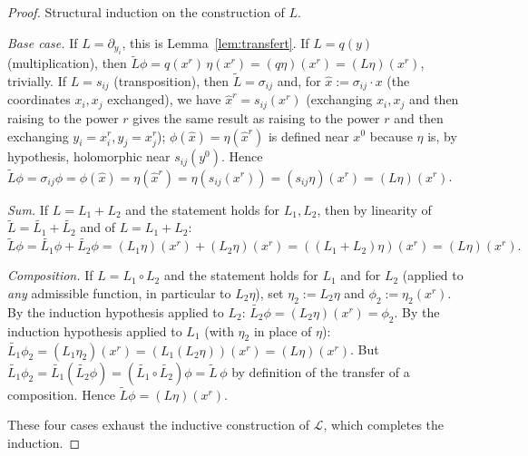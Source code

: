 \documentclass[11pt]{article}
\theoremstyle{remark}
\begin{document}
\begin{proof}
Structural induction on the construction of $L$.

\emph{Base case.} If $L=\partial_{y_i}$, this is Lemma~\ref{lem:transfert}. If $L=q(y)$ (multiplication), then $\widetilde L\phi = q(x^r)\,\eta(x^r) = (q\eta)(x^r) = (L\eta)(x^r)$, trivially. If $L=s_{ij}$ (transposition), then $\widetilde L=\sigma_{ij}$ and, for $\hat x:=\sigma_{ij}\cdot x$ (the coordinates $x_i,x_j$ exchanged), we have $\hat x^r = s_{ij}(x^r)$ (exchanging $x_i,x_j$ and then raising to the power $r$ gives the same result as raising to the power $r$ and then exchanging $y_i=x_i^r,y_j=x_j^r$); $\phi(\hat x)=\eta(\hat x^r)$ is defined near $x^0$ because $\eta$ is, by hypothesis, holomorphic near $s_{ij}(y^0)$. Hence $\widetilde L\phi = \sigma_{ij}\phi = \phi(\hat x) = \eta(\hat x^r) = \eta(s_{ij}(x^r)) = (s_{ij}\eta)(x^r) = (L\eta)(x^r)$.

\emph{Sum.} If $L=L_1+L_2$ and the statement holds for $L_1,L_2$, then by linearity of $\widetilde L=\widetilde{L_1}+\widetilde{L_2}$ and of $L=L_1+L_2$:
\[
\widetilde L\phi = \widetilde{L_1}\phi+\widetilde{L_2}\phi = (L_1\eta)(x^r)+(L_2\eta)(x^r) = ((L_1+L_2)\eta)(x^r) = (L\eta)(x^r).
\]

\emph{Composition.} If $L=L_1\circ L_2$ and the statement holds for $L_1$ and for $L_2$ (applied to \emph{any} admissible function, in particular to $L_2\eta$), set $\eta_2:=L_2\eta$ and $\phi_2:=\eta_2(x^r)$. By the induction hypothesis applied to $L_2$: $\widetilde{L_2}\phi=(L_2\eta)(x^r)=\phi_2$. By the induction hypothesis applied to $L_1$ (with $\eta_2$ in place of $\eta$): $\widetilde{L_1}\phi_2 = (L_1\eta_2)(x^r) = (L_1(L_2\eta))(x^r)=(L\eta)(x^r)$. But $\widetilde{L_1}\phi_2 = \widetilde{L_1}(\widetilde{L_2}\phi) = (\widetilde{L_1}\circ\widetilde{L_2})\phi = \widetilde L\,\phi$ by definition of the transfer of a composition. Hence $\widetilde L\phi=(L\eta)(x^r)$.

These four cases exhaust the inductive construction of $\mathcal L$, which completes the induction.
\end{proof}
\end{document}
